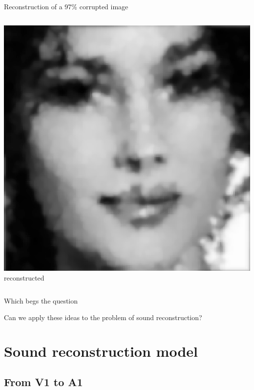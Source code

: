\documentclass[10pt,american,ignorenonframetext,aspectratio=1610]{beamer}
\theoremstyle{remark}
\begin{document}
\begin{frame}{Reconstruction of a 97\% corrupted image}
\begin{columns}[T]
\begin{column}{0.3\textwidth}
\centering

\includegraphics{img/img_reconstructed.png} reconstructed
\end{column}
\end{columns}

\end{frame}

\begin{frame}{Which begs the question}
\protect\hypertarget{which-begs-the-question}{}

Can we apply these ideas to the problem of sound reconstruction?

\end{frame}

\hypertarget{sound-reconstruction-model}{%
\section{Sound reconstruction model}\label{sound-reconstruction-model}}

\hypertarget{from-v1-to-a1}{%
\subsection{From V1 to A1}\label{from-v1-to-a1}}
\end{document}
